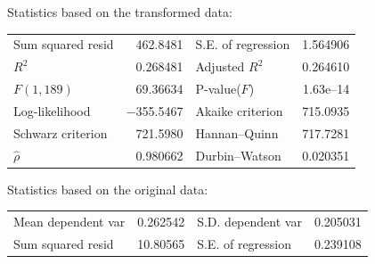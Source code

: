 \documentclass[11pt]{article}
\begin{document}
\begin{appendices}
\begin{table}[H]
\begin{center}
	\vspace{1em}Statistics based on the transformed data:

	\vspace{1ex}
	\begin{tabular}{lrlr}
		Sum squared resid &  462.8481 & S.E. of regression &  1.564906 \\
		$R^2$ &  0.268481 & Adjusted $R^2$ &  0.264610 \\
		$F(1, 189)$ &  69.36634 & P-value($F$) &  1.63\textrm{e--14} \\
		Log-likelihood & $-$355.5467 & Akaike criterion &  715.0935 \\
		Schwarz criterion &  721.5980 & Hannan--Quinn &  717.7281 \\
		$\hat{\rho}$ &  0.980662 & Durbin--Watson &  0.020351 \\
	\end{tabular}

	\vspace{1em}Statistics based on the original data:

	\vspace{1ex}
	\begin{tabular}{lrlr}
		Mean dependent var &  0.262542 & S.D. dependent var &  0.205031 \\
		Sum squared resid &  10.80565 & S.E. of regression &  0.239108 \\
	\end{tabular}
	\end{center}
	\label{tab:11}
\end{table}



\end{appendices}
\end{document}
